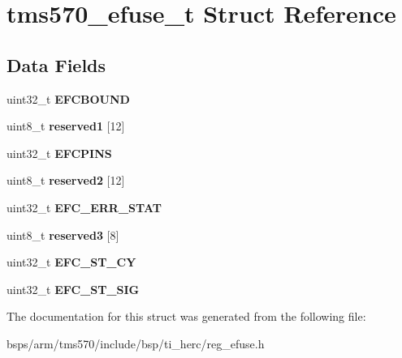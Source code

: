 \hypertarget{structtms570__efuse__t}{}\section{tms570\+\_\+efuse\+\_\+t Struct Reference}
\label{structtms570__efuse__t}
\subsection*{Data Fields}
\begin{DoxyCompactItemize}
\item 
\mbox{\label{structtms570__efuse__t_a2a954869352d08c14f3733ba92f68f79}} 
uint32\+\_\+t {\bfseries E\+F\+C\+B\+O\+U\+ND}
\item 
\mbox{\label{structtms570__efuse__t_a478419b93d52ea2e0ae084592eb0d123}} 
uint8\+\_\+t {\bfseries reserved1} \mbox{[}12\mbox{]}
\item 
\mbox{\label{structtms570__efuse__t_aaa1bd8c61e8d40a2dd5e9fa6139a8c5d}} 
uint32\+\_\+t {\bfseries E\+F\+C\+P\+I\+NS}
\item 
\mbox{\label{structtms570__efuse__t_ac039a7c54fd8e21432b77aa3bc5a5ba7}} 
uint8\+\_\+t {\bfseries reserved2} \mbox{[}12\mbox{]}
\item 
\mbox{\label{structtms570__efuse__t_a6b21387d1aec1a796813c21de6f1b869}} 
uint32\+\_\+t {\bfseries E\+F\+C\+\_\+\+E\+R\+R\+\_\+\+S\+T\+AT}
\item 
\mbox{\label{structtms570__efuse__t_af5a5c0ac5abe28a6e724a17c8fe24b79}} 
uint8\+\_\+t {\bfseries reserved3} \mbox{[}8\mbox{]}
\item 
\mbox{\label{structtms570__efuse__t_a0473a4076a3c00b1b667d92732863e6f}} 
uint32\+\_\+t {\bfseries E\+F\+C\+\_\+\+S\+T\+\_\+\+CY}
\item 
\mbox{\label{structtms570__efuse__t_a541774d3913a09b3da02c79fda1245dd}} 
uint32\+\_\+t {\bfseries E\+F\+C\+\_\+\+S\+T\+\_\+\+S\+IG}
\end{DoxyCompactItemize}


The documentation for this struct was generated from the following file\+:\begin{DoxyCompactItemize}
\item 
bsps/arm/tms570/include/bsp/ti\+\_\+herc/reg\+\_\+efuse.\+h\end{DoxyCompactItemize}
